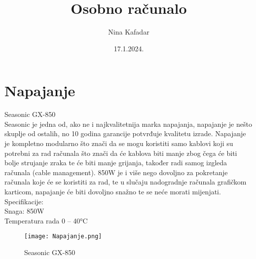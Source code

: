 \documentclass{report}
\begin{document}
\title{Osobno računalo}
\author{Nina Kafadar}
\date{17.1.2024.}
\maketitle
\tableofcontents
\listoffigures

 
\chapter{Napajanje}
Seasonic GX-850
\\ Seasonic je jedna od, ako ne i najkvalitetnija marka napajanja, napajanje je nešto skuplje od ostalih, no 10 godina garancije potvrđuje kvalitetu izrade. Napajanje je kompletno modularno što znači da se mogu koristiti samo kablovi koji su potrebni za rad računala što znači da će kablova biti manje zbog čega će biti bolje strujanje zraka te će biti manje grijanja, također radi samog izgleda računala (cable management). 850W je i više nego dovoljno za pokretanje računala koje će se koristiti za rad, te u slučaju nadogradnje računala grafičkom karticom, napajanje će biti dovoljno snažno te se neće morati mijenjati.
\\Specifikacije: 
\\Snaga: 850W
\\Temperatura rada 0 – 40°C
\begin{figure}[h]
\texttt{[image: Napajanje.png]}
\caption{Seasonic GX-850}
\end{figure}
\end{document}
